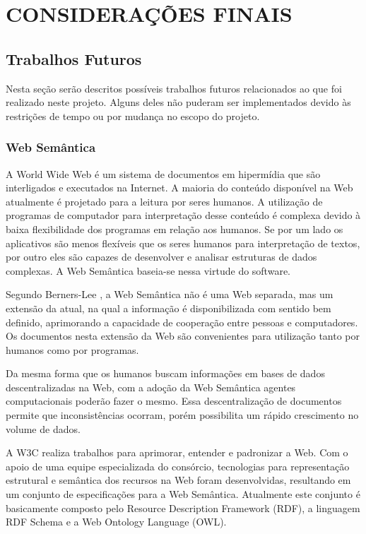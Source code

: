 \chapter{CONSIDERAÇÕES FINAIS} %
\label{cha:consideracoes_finais}

\section{Trabalhos Futuros}
\label{sec:trabalho_futuros}

 Nesta seção serão descritos possíveis trabalhos futuros relacionados ao que foi realizado neste projeto. Alguns deles não puderam ser implementados devido às restrições de tempo ou por mudança no escopo do projeto.

\subsection{Web Semântica} %
\label{sub:web_semantica}

 A World Wide Web é um sistema de documentos em hipermídia que são interligados e executados na Internet. A maioria do conteúdo disponível na Web atualmente é projetado para a leitura por seres humanos. A utilização de programas de computador para interpretação desse conteúdo é complexa devido à baixa flexibilidade dos programas em relação aos humanos. Se por um lado os aplicativos são menos flexíveis que os seres humanos para interpretação de textos, por outro eles são capazes de desenvolver e analisar estruturas de dados complexas. A Web Semântica baseia-se nessa virtude do software. 

 Segundo Berners-Lee \cite{bemerslee2001sw}, a Web Semântica não é uma Web separada, mas um extensão da atual, na qual a informação é disponibilizada com sentido bem definido, aprimorando a capacidade de cooperação entre pessoas e computadores. Os documentos nesta extensão da Web são convenientes para utilização tanto por humanos como por programas.

 Da mesma forma que os humanos buscam informações em bases de dados descentralizadas na Web, com a adoção da Web Semântica agentes computacionais poderão fazer o mesmo. Essa descentralização de documentos permite que inconsistências ocorram, porém possibilita um rápido crescimento no volume de dados.

 A W3C realiza trabalhos para aprimorar, entender e padronizar a Web. Com o apoio de uma equipe especializada do consórcio, tecnologias para representação estrutural e semântica dos recursos na Web foram desenvolvidas, resultando em um conjunto de especificações para a Web Semântica. Atualmente este conjunto é basicamente composto pelo Resource Description Framework (RDF), a linguagem RDF Schema e a Web Ontology Language (OWL).

